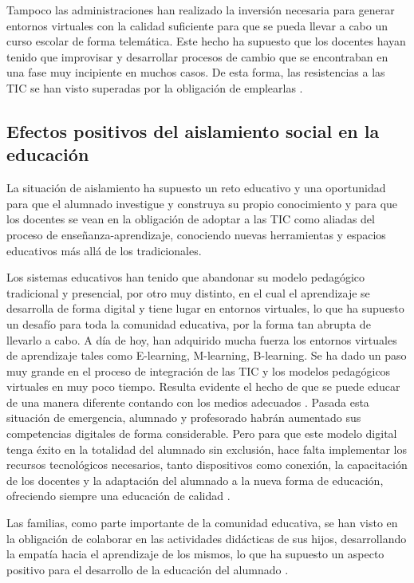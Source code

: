 \documentclass[spanish]{textolivre}
\begin{document}
Tampoco las administraciones han realizado la inversión necesaria para generar entornos virtuales con la calidad suficiente para que se pueda llevar a cabo un curso escolar de forma telemática. Este hecho ha supuesto que los docentes hayan tenido que improvisar y desarrollar procesos de cambio que se encontraban en una fase muy incipiente en muchos casos. De esta forma, las resistencias a las TIC se han visto superadas por la obligación de emplearlas \cite{martinezlopez2020}.

\subsection{Efectos positivos del aislamiento social en la educación}
La situación de aislamiento ha supuesto un reto educativo y una oportunidad para que el alumnado investigue y construya su propio conocimiento \cite{ceballosmaron2020} y para que los docentes se vean en la obligación de adoptar a las TIC como aliadas del proceso de enseñanza-aprendizaje, conociendo nuevas herramientas y espacios educativos más allá de los tradicionales.

Los sistemas educativos han tenido que abandonar su modelo pedagógico tradicional y presencial, por otro muy distinto, en el cual el aprendizaje se desarrolla de forma digital y tiene lugar en entornos virtuales, lo que ha supuesto un desafío para toda la comunidad educativa, por la forma tan abrupta de llevarlo a cabo. A día de hoy, han adquirido mucha fuerza los entornos virtuales de aprendizaje tales como E-learning, M-learning, B-learning. Se ha dado un paso muy grande en el proceso de integración de las TIC y los modelos pedagógicos virtuales en muy poco tiempo. Resulta evidente el hecho de que se puede educar de una manera diferente contando con los medios adecuados \cite{moraaristega2021}. Pasada esta situación de emergencia, alumnado y profesorado habrán aumentado sus competencias digitales de forma considerable. Pero para que este modelo digital tenga éxito en la totalidad del alumnado sin exclusión, hace falta implementar los recursos tecnológicos necesarios, tanto dispositivos como conexión, la capacitación de los docentes y la adaptación del alumnado a la nueva forma de educación, ofreciendo siempre una educación de calidad \cite{condor-herrera2020}.

Las familias, como parte importante de la comunidad educativa, se han visto en la obligación de colaborar en las actividades didácticas de sus hijos, desarrollando la empatía hacia el aprendizaje de los mismos, lo que ha supuesto un aspecto positivo para el desarrollo de la educación del alumnado \cite{moraaristega2021}.
\end{document}
